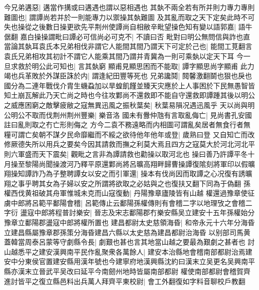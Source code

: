 今兄弟遘惡|{
	遘當作搆或曰遘遇也謂以惡相遇也}
其埶不兩全若有所并則力專力專則難圖也|{
	謂譚尚若并於一則能專力以禦操其埶難圖}
及其亂而取之天下定矣此時不可失也操從之後數日操更欲先平荆州使譚尚自相敝辛毗望操色知有變以語郭嘉|{
	語牛倨翻}
嘉白操操謂毗曰譚必可信尚必可克不|{
	不讀曰否}
毗對曰明公無問信與詐也直當論其埶耳袁氏本兄弟相伐非謂它人能間其間乃謂天下可定於己也|{
	能間工莧翻言袁氏兄弟相攻其初計不謂它人能乘其間乃謂并青冀為一則可乘埶以定天下耳}
今一旦求救於明公此可知也|{
	言其埶窮}
顯甫見顯思困而不能取|{
	譚字顯思尚字顯甫}
此力竭也兵革敗於外謀臣誅於内|{
	謂逢紀田豐等死也}
兄弟讒鬩|{
	䦧馨激翻鬬也狠也戾也}
國分為二連年戰伐介胄生蟣蝨加以旱蝗飢饉並臻天灾應於上人事困於下民無愚智皆知土崩瓦解此乃天亡尚之時也今往攻鄴尚不還救即不能自守還救即譚踵其後以明公之威應困窮之敵擊疲敝之寇無異迅風之振秋葉矣|{
	秋葉易隕况遇迅風乎}
天以尚與明公明公不取而伐荆州荆州豐樂|{
	樂音洛}
國未有釁仲虺有言取亂侮亡|{
	見尚書孔安國註曰亂則取之冇亡形則侮之}
方今二袁不務遠略而内相圖可謂亂矣居者無食行者無糧可謂亡矣朝不謀夕民命靡繼而不綏之欲待他年他年或登|{
	歲熟曰登}
又自知亡而改修厥德失所以用兵之要矣今因其請救而撫之利莫大焉且四方之寇莫大於河北河北平則六軍盛而天下震矣|{
	觀毗之言非為譚請救也勸操以取河北也}
操曰善乃許譚平冬十月操至黎陽尚聞操渡河乃釋平原還鄴尚將呂曠高翔畔歸曹操譚復隂刻將軍印以假曠翔操知譚詐乃為子整聘譚女以安之而引軍還|{
	操本有伐尚因而取譚之心况復有誘曠翔之事乎聘其女為子婦以安之所謂將欲取之必姑與之也復扶又翻下同為于偽翻}
孫權西伐黄祖破其舟軍惟城未克而山寇復動|{
	丹陽豫章廬陵皆有山越}
權還過豫章使征虜中郎將呂範平鄱陽會稽|{
	呂範傳止云鄱陽孫權傳則有會稽二字以地理攷之會稽二字衍}
盪寇中郎將程普討樂安|{
	晉志及宋志鄱陽郡冇樂安縣吴立建安十五年孫權始分豫章立鄱陽郡盪寇中郎將權所置也}
建昌都尉太史慈領海昏|{
	和帝永元十六年分海昏立建昌縣屬豫章郡孫策分海昏建昌六縣以太史慈為建昌都尉治海昏}
以别部司馬黄蓋韓當周泰呂蒙等守劇縣令長|{
	劇艱也甚也言其地當山越之要最為艱劇之甚者也}
討山越悉平之建安漢興南平民作亂聚衆各萬餘人|{
	建安本治縣地會稽南部都尉治焉建安中分東侯官置建安縣用漢年號也今建寧府地漢興縣沈約曰漢末立吴更名吴興南平縣亦漢末立晉武平吴改曰延平今南劒州地時皆屬南部都尉}
權使南部都尉會稽賀齊進討皆平之復立縣邑料出兵萬人拜齊平東校尉|{
	會工外翻復如字料音聊校戶教翻}


